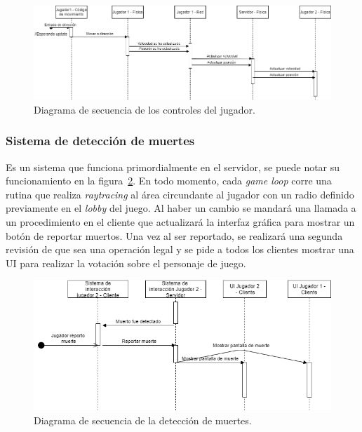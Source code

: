 \begin{figure}[H]
    \centering
    \includegraphics[width=1\linewidth]{images/diagrama_secuencia_movimientos.png}
    \caption{Diagrama de secuencia de los controles del jugador.}
    \label{fig:diagrama_sec_movimiento}
\end{figure}

\subsubsection{Sistema de detección de muertes}

Es un sistema que funciona primordialmente en el servidor, se puede notar su funcionamiento en la figura~\ref{fig:diagrama_sec_detect_muertes}. En todo momento, cada \textit{game loop} corre una rutina que realiza \textit{raytracing} al área circundante al jugador con un radio definido previamente en el \textit{lobby} del juego. Al haber un cambio se mandará una llamada a un procedimiento en el cliente que actualizará la interfaz gráfica para mostrar un botón de reportar muertos. Una vez al ser reportado, se realizará una segunda revisión de que sea una operación legal y se pide a todos los clientes mostrar una UI para realizar la votación sobre el personaje de juego.

\begin{figure}[H]
    \centering
    \includegraphics[width=1\linewidth]{images/diagrama_deteccion_muerte.png}
    \caption{Diagrama de secuencia de la detección de muertes.}
    \label{fig:diagrama_sec_detect_muertes}
\end{figure}

